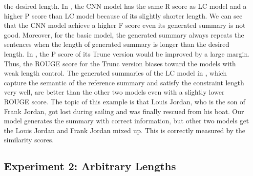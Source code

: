 the desired length.
In , 
the CNN model has the same R score 
as LC model and a higher P score than LC model because of its slightly
shorter length.  
We can see that the CNN model achieve a higher F score even its generated summary is not good. 
Moreover, for the basic model,
the generated summary always repeats the sentences
when the length of generated summary is longer than the desired length.
In , 
the P score of its Trunc version would be improved
by a large margin.
Thus, the ROUGE score for the Trunc version biases toward
the models with weak length control.
The generated summaries of the LC model in , 
which capture the semantic of the reference summary and 
satisfy the constraint length very well,
are better than the other two models even with a slightly lower ROUGE score.
The topic of this example is that Louis Jordan, who is the son of Frank Jordan, 
got lost during sailing and was finally rescued from his boat. 
Our model generates the summary with correct
information, but other two models get the Louis Jordan and Frank Jordan mixed up.
This is correctly measured by the similarity scores. 


\subsection{Experiment 2: Arbitrary Lengths}


